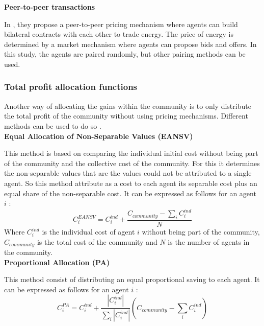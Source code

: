 \documentclass[12pt,a4paper]{article}
\begin{document}
\noindent\textbf{Peer-to-peer transactions}



In \cite{these_new}, they propose a peer-to-peer pricing mechanism where agents can build bilateral contracts with each other to trade energy. The price of energy is determined by a market mechanism where agents can propose bids and offers. In this study, the agents are paired randomly, but other pairing methods can be used.

\subsubsection{Total profit allocation functions}

Another way of allocating the gains within the community is to only distribute the total profit of the community without using pricing mechanisms. Different methods can be used to do so \cite{these_new, article_1}.
\\

\noindent\textbf{Equal Allocation of Non-Separable Values (EANSV)}

This method \cite{these_new} is based on comparing the individual initial cost without being part of the community and the collective cost of the community. For this it determines the non-separable values that are the values could not be attributed to a single agent. So this method attribute as a cost to each agent its separable cost plus an equal share of the non-separable cost. It can be expressed as follows for an agent $i$ :
\begin{equation}
    C_i^{EANSV} = C_i^{ind} + \frac{C_{community} - \sum_{i}{C_i^{ind}}}{N} \nonumber
\end{equation}
Where $C_i^{ind}$ is the individual cost of agent $i$ without being part of the community, $C_{community}$ is the total cost of the community and $N$ is the number of agents in the community.\\

\noindent\textbf{Proportional Allocation (PA)}

This method consist of distributing an equal proportional saving to each agent. It can be expressed as follows for an agent $i$ :
\begin{equation}
    C_i^{PA} = C_i^{ind} + \frac{|C_i^{ind}|}{\sum_{i}{|C_i^{ind}|}} (C_{community} - \sum_{i}{C_i^{ind}}) \nonumber
\end{equation}
\end{document}
